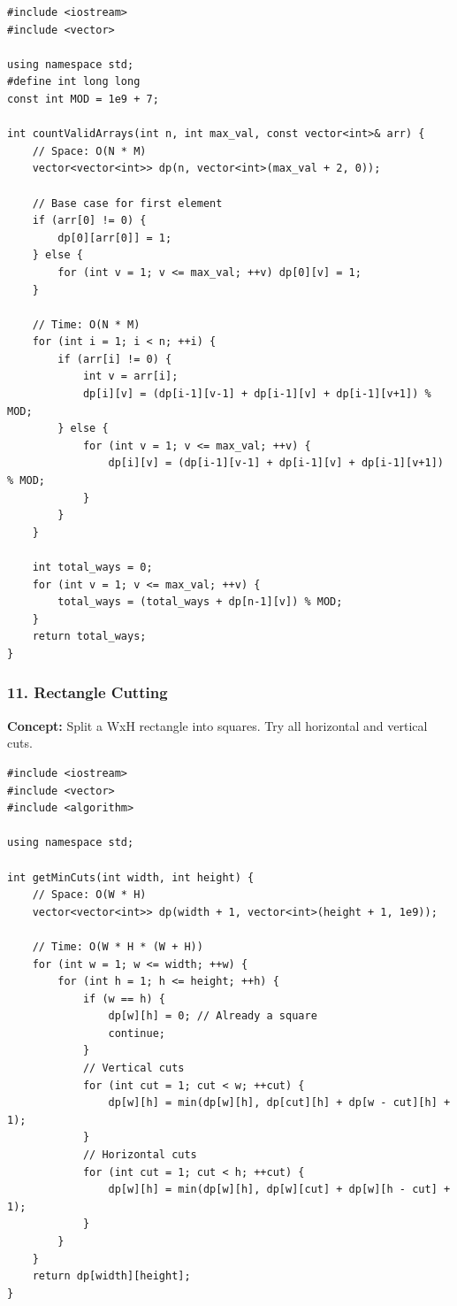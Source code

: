 \begin{lstlisting}
#include <iostream>
#include <vector>

using namespace std;
#define int long long
const int MOD = 1e9 + 7;

int countValidArrays(int n, int max_val, const vector<int>& arr) {
    // Space: O(N * M)
    vector<vector<int>> dp(n, vector<int>(max_val + 2, 0));
    
    // Base case for first element
    if (arr[0] != 0) {
        dp[0][arr[0]] = 1;
    } else {
        for (int v = 1; v <= max_val; ++v) dp[0][v] = 1;
    }
    
    // Time: O(N * M)
    for (int i = 1; i < n; ++i) {
        if (arr[i] != 0) {
            int v = arr[i];
            dp[i][v] = (dp[i-1][v-1] + dp[i-1][v] + dp[i-1][v+1]) % MOD;
        } else {
            for (int v = 1; v <= max_val; ++v) {
                dp[i][v] = (dp[i-1][v-1] + dp[i-1][v] + dp[i-1][v+1]) % MOD;
            }
        }
    }
    
    int total_ways = 0;
    for (int v = 1; v <= max_val; ++v) {
        total_ways = (total_ways + dp[n-1][v]) % MOD;
    }
    return total_ways;
}
\end{lstlisting}

\subsubsection{11. Rectangle Cutting}
\textbf{Concept:} Split a WxH rectangle into squares. Try all horizontal and vertical cuts.

\begin{lstlisting}
#include <iostream>
#include <vector>
#include <algorithm>

using namespace std;

int getMinCuts(int width, int height) {
    // Space: O(W * H)
    vector<vector<int>> dp(width + 1, vector<int>(height + 1, 1e9));
    
    // Time: O(W * H * (W + H))
    for (int w = 1; w <= width; ++w) {
        for (int h = 1; h <= height; ++h) {
            if (w == h) {
                dp[w][h] = 0; // Already a square
                continue;
            }
            // Vertical cuts
            for (int cut = 1; cut < w; ++cut) {
                dp[w][h] = min(dp[w][h], dp[cut][h] + dp[w - cut][h] + 1);
            }
            // Horizontal cuts
            for (int cut = 1; cut < h; ++cut) {
                dp[w][h] = min(dp[w][h], dp[w][cut] + dp[w][h - cut] + 1);
            }
        }
    }
    return dp[width][height];
}
\end{lstlisting}


